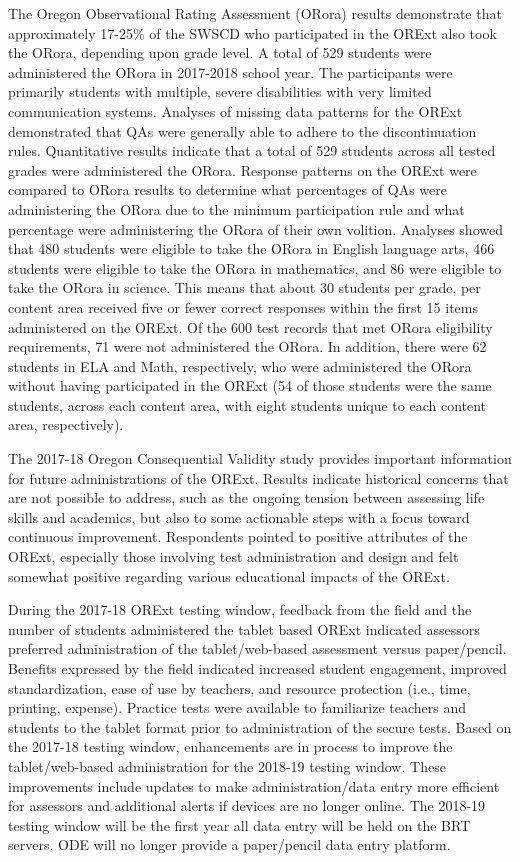 \documentclass[]{article}
\begin{document}
The Oregon Observational Rating Assessment (ORora) results demonstrate
that approximately 17-25\% of the SWSCD who participated in the ORExt
also took the ORora, depending upon grade level. A total of 529 students
were administered the ORora in 2017-2018 school year. The participants
were primarily students with multiple, severe disabilities with very
limited communication systems. Analyses of missing data patterns for the
ORExt demonstrated that QAs were generally able to adhere to the
discontinuation rules. Quantitative results indicate that a total of 529
students across all tested grades were administered the ORora. Response
patterns on the ORExt were compared to ORora results to determine what
percentages of QAs were administering the ORora due to the minimum
participation rule and what percentage were administering the ORora of
their own volition. Analyses showed that 480 students were eligible to
take the ORora in English language arts, 466 students were eligible to
take the ORora in mathematics, and 86 were eligible to take the ORora in
science. This means that about 30 students per grade, per content area
received five or fewer correct responses within the first 15 items
administered on the ORExt. Of the 600 test records that met ORora
eligibility requirements, 71 were not administered the ORora. In
addition, there were 62 students in ELA and Math, respectively, who were
administered the ORora without having participated in the ORExt (54 of
those students were the same students, across each content area, with
eight students unique to each content area, respectively).

The 2017-18 Oregon Consequential Validity study provides important
information for future administrations of the ORExt. Results indicate
historical concerns that are not possible to address, such as the
ongoing tension between assessing life skills and academics, but also to
some actionable steps with a focus toward continuous improvement.
Respondents pointed to positive attributes of the ORExt, especially
those involving test administration and design and felt somewhat
positive regarding various educational impacts of the ORExt.

During the 2017-18 ORExt testing window, feedback from the field and the
number of students administered the tablet based ORExt indicated
assessors preferred administration of the tablet/web-based assessment
versus paper/pencil. Benefits expressed by the field indicated increased
student engagement, improved standardization, ease of use by teachers,
and resource protection (i.e., time, printing, expense). Practice tests
were available to familiarize teachers and students to the tablet format
prior to administration of the secure tests. Based on the 2017-18
testing window, enhancements are in process to improve the
tablet/web-based administration for the 2018-19 testing window. These
improvements include updates to make administration/data entry more
efficient for assessors and additional alerts if devices are no longer
online. The 2018-19 testing window will be the first year all data entry
will be held on the BRT servers. ODE will no longer provide a
paper/pencil data entry platform.
\end{document}
